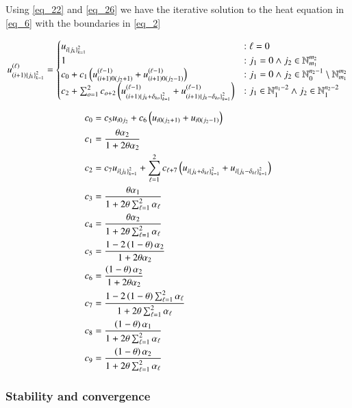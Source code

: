 \documentclass[11pt,english,a4paper]{article}
\begin{document}
\begin{flushleft}
Using \eqref{eq_22} and \eqref{eq_26} we have the iterative solution to the heat equation in \eqref{eq_6} with the boundaries in \eqref{eq_2}

\begin{align}
u_{(i+1)\left\lbrace{j_k}\right\rbrace_{k=1}^2}^{(\ell)} = \begin{cases}
u_{i\left\lbrace{j_k}\right\rbrace_{k=1}^2} &: \ell = 0 \\
1 &: j_1=0 \wedge j_2\in\mathbb{N}_{m_1}^{m_2} \\
c_0 + c_1\left({u_{(i+1)0(j_2+1)}^{(\ell-1)}+u_{(i+1)0(j_2-1)}^{(\ell-1)}}\right) &: j_1=0 \wedge j_2\in\mathbb{N}_0^{n_2-1} \setminus\mathbb{N}_{m_1}^{m_2} \\
c_2 + \sum_{o=1}^2 c_{o+2}\left({u_{(i+1)\left\lbrace{j_k+\delta_{ko}}\right\rbrace_{k=1}^2}^{(\ell-1)}+u_{(i+1)\left\lbrace{j_k-\delta_{ko}}\right\rbrace_{k=1}^2}^{(\ell-1)}}\right) &: j_1\in \mathbb{N}_{1}^{n_1-2} \wedge j_2\in\mathbb{N}_1^{n_2-2} 
\end{cases} 
\label{eq_27}
\end{align}

\begin{align}
c_0 &= c_5 u_{i0j_2} + c_6\left({u_{i0(j_2+1)} + u_{i0(j_2-1)}}\right)
\label{eq_28}\\
c_1 &= \frac{\theta \alpha_2}{1+2\theta\alpha_2}
\label{eq_29}\\
c_2 &= c_7 u_{i\left\lbrace{j_k}\right\rbrace_{k=1}^2} + \sum_{\ell=1}^2 c_{\ell+7} \left({u_{i\left\lbrace{j_k+\delta_{k\ell}}\right\rbrace_{k=1}^2} + u_{i\left\lbrace{j_k-\delta_{k\ell}}\right\rbrace_{k=1}^2}}\right)
\label{eq_30}\\
c_3 &= \frac{\theta \alpha_1}{1+ 2\theta \sum_{\ell = 1}^2 \alpha_\ell}
\label{eq_31}\\
c_4 &= \frac{\theta \alpha_2}{1+ 2\theta \sum_{\ell = 1}^2 \alpha_\ell}
\label{eq_32}\\
c_5 &= \frac{1-2\left({1-\theta}\right)\alpha_2}{1+2\theta \alpha_2} 
\label{eq_33}\\
c_6 &= \frac{\left({1-\theta}\right)\alpha_2}{1+2\theta \alpha_2} 
\label{eq_34}\\
c_7 &= \frac{1-2\left({1-\theta}\right)\sum_{\ell = 1}^2 \alpha_\ell}{1+ 2\theta \sum_{\ell = 1}^2 \alpha_\ell}
\label{eq_35}\\
c_8 &= \frac{\left({1-\theta}\right)\alpha_1}{1+ 2\theta \sum_{\ell = 1}^2 \alpha_\ell}
\label{eq_36}\\
c_9 &= \frac{\left({1-\theta}\right)\alpha_2}{1+ 2\theta \sum_{\ell = 1}^2 \alpha_\ell}
\label{eq_37}
\end{align}

\subsubsection{Stability and convergence}


\end{flushleft}
\end{document}

